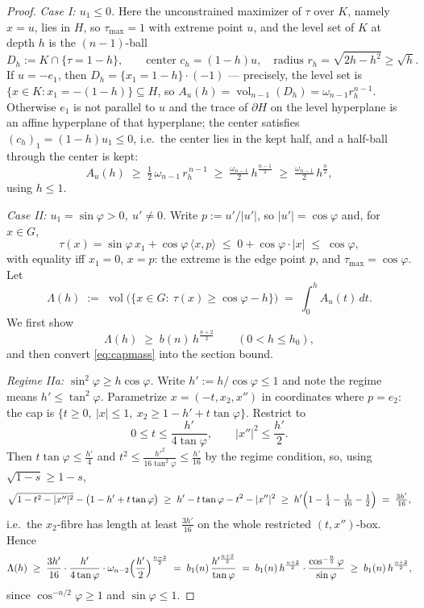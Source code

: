 \documentclass[11pt]{article}
\newcommand{\vol}{\operatorname{vol}}
\begin{document}
\begin{proof}
\emph{Case I: $u_1\le0$.}  Here the unconstrained maximizer of
$\tau$ over $K$, namely $x=u$, lies in $H$, so $\tau_{\max}=1$ with extreme
point $u$, and the level set of $K$ at depth $h$ is the $(n-1)$-ball
\[
D_h:=K\cap\{\tau=1-h\},
\qquad\text{center }c_h=(1-h)u,\quad\text{radius }r_h=\sqrt{2h-h^2}\ge\sqrt h .
\]
If $u=-e_1$, then $D_h=\{x_1=1-h\}\cdot(-1)$ --- precisely, the level set is
$\{x\in K: x_1=-(1-h)\}\subseteq H$, so $A_u(h)=\vol_{n-1}(D_h)
=\omega_{n-1}r_h^{n-1}$.  Otherwise $e_1$ is not parallel to $u$ and the
trace of $\partial H$ on the level hyperplane is an affine hyperplane of that
hyperplane; the center satisfies $(c_h)_1=(1-h)u_1\le0$, i.e.\ the center
lies in the kept half, and a half-ball through the center is kept:
\[
A_u(h)\;\ge\;\tfrac12\,\omega_{n-1}\,r_h^{\,n-1}
\;\ge\;\tfrac{\omega_{n-1}}2\,h^{\frac{n-1}2}
\;\ge\;\tfrac{\omega_{n-1}}2\,h^{\frac n2},
\]
using $h\le1$.

\emph{Case II: $u_1=\sin\varphi>0$, $u'\ne0$.}  Write $p:=u'/|u'|$, so
$|u'|=\cos\varphi$ and, for $x\in G$,
\[
\tau(x)=\sin\varphi\,x_1+\cos\varphi\,\langle x,p\rangle
\;\le\;0+\cos\varphi\cdot|x|\;\le\;\cos\varphi,
\]
with equality iff $x_1=0$, $x=p$: the extreme is the edge point $p$, and
$\tau_{\max}=\cos\varphi$.  Let
\[
\Lambda(h)\;:=\;\vol\bigl(\{x\in G:\ \tau(x)\ge\cos\varphi-h\}\bigr)
\;=\;\int_0^hA_u(t)\,dt .
\]
We first show
\begin{equation}\label{eq:capmass}
\Lambda(h)\;\ge\;b(n)\,h^{\frac{n+2}2}
\qquad(0<h\le h_0),
\end{equation}
and then convert \eqref{eq:capmass} into the section bound.

\emph{Regime IIa: $\sin^2\varphi\ge h\cos\varphi$.}  Write
$h':=h/\cos\varphi\le1$ and note the regime means
$h'\le\tan^2\varphi$.  Parametrize $x=(-t,x_2,x'')$ in coordinates where
$p=e_2$: the cap is
$\{t\ge0,\ |x|\le1,\ x_2\ge1-h'+t\tan\varphi\}$.  Restrict to
\[
0\le t\le\frac{h'}{4\tan\varphi},
\qquad
|x''|^2\le\frac{h'}2 .
\]
Then $t\tan\varphi\le\frac{h'}4$ and
$t^2\le\frac{h'^2}{16\tan^2\varphi}\le\frac{h'}{16}$ by the regime
condition, so, using $\sqrt{1-s}\ge1-s$,
\[
\sqrt{1-t^2-|x''|^2}-\bigl(1-h'+t\tan\varphi\bigr)
\;\ge\;h'-t\tan\varphi-t^2-|x''|^2
\;\ge\;h'\Bigl(1-\tfrac14-\tfrac1{16}-\tfrac12\Bigr)
\;=\;\tfrac{3h'}{16},
\]
i.e.\ the $x_2$-fibre has length at least $\frac{3h'}{16}$ on the whole
restricted $(t,x'')$-box.  Hence
\[
\Lambda(h)\;\ge\;\frac{3h'}{16}\cdot\frac{h'}{4\tan\varphi}\cdot
\omega_{n-2}\Bigl(\frac{h'}2\Bigr)^{\frac{n-2}2}
\;=\;b_1(n)\,\frac{h'^{\frac{n+2}2}}{\tan\varphi}
\;=\;b_1(n)\,h^{\frac{n+2}2}\cdot\frac{\cos^{-\frac n2}\varphi}{\sin\varphi}
\;\ge\;b_1(n)\,h^{\frac{n+2}2},
\]
since $\cos^{-n/2}\varphi\ge1$ and $\sin\varphi\le1$.


\end{proof}
\end{document}
